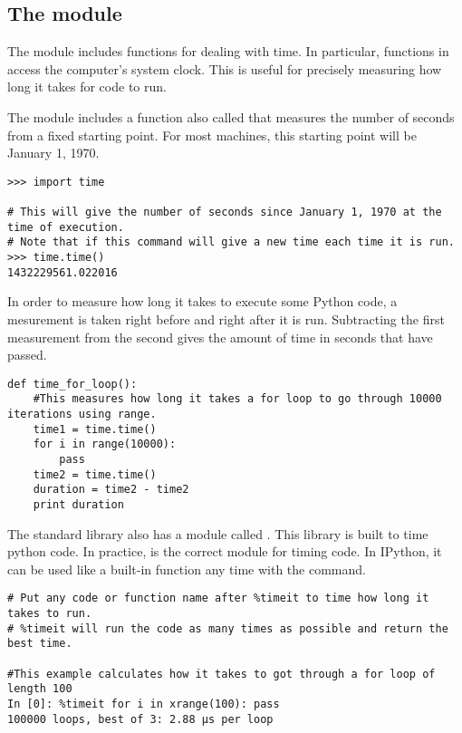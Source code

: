 \subsection*{The  module}

The  module includes functions for dealing with time.
In particular, functions in  access the computer's system clock.
This is useful for precisely measuring how long it takes for code to run.

The  module includes a function also called  that measures the number of seconds from a fixed starting point.
For most machines, this starting point will be January 1, 1970.

\begin{lstlisting}
>>> import time

# This will give the number of seconds since January 1, 1970 at the time of execution.
# Note that if this command will give a new time each time it is run.
>>> time.time()
1432229561.022016
\end{lstlisting}

In order to measure how long it takes to execute some Python code, a mesurement is taken right before and right after it is run.
Subtracting the first measurement from the second gives the amount of time in seconds that have passed.

\begin{lstlisting}
def time_for_loop():
	#This measures how long it takes a for loop to go through 10000 iterations using range.
	time1 = time.time()
	for i in range(10000):
		pass
	time2 = time.time()
	duration = time2 - time2
	print duration
\end{lstlisting}

The standard library also has a module called .
This library is built to time python code.
In practice,  is the correct module for timing code.
In IPython, it can be used like a built-in function any time with the  command.

\begin{lstlisting}
# Put any code or function name after %timeit to time how long it takes to run.
# %timeit will run the code as many times as possible and return the best time.

#This example calculates how it takes to got through a for loop of length 100
In [0]: %timeit for i in xrange(100): pass 
100000 loops, best of 3: 2.88 µs per loop 
\end{lstlisting}


